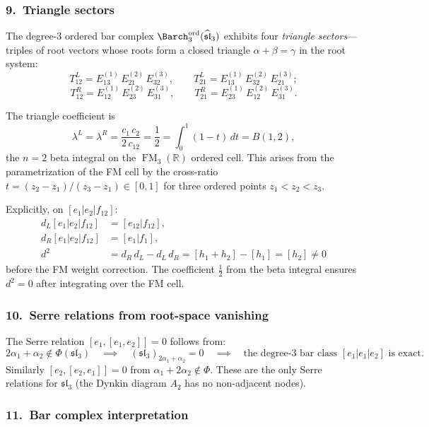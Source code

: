 \subsubsection*{9.\ Triangle sectors}

The degree-$3$ ordered bar complex
$\Barch_3^{\mathrm{ord}}(\widehat{\mathfrak{sl}}_3)$
exhibits four \emph{triangle sectors}---triples of root vectors
whose roots form a closed triangle
$\alpha + \beta = \gamma$ in the root system:
\[
T^L_{12} = E_{13}^{(1)}\,E_{21}^{(2)}\,E_{32}^{(3)},
\qquad
T^L_{21} = E_{13}^{(1)}\,E_{32}^{(2)}\,E_{21}^{(3)};
\]
\[
T^R_{12} = E_{12}^{(1)}\,E_{23}^{(2)}\,E_{31}^{(3)},
\qquad
T^R_{21} = E_{23}^{(1)}\,E_{12}^{(2)}\,E_{31}^{(3)}.
\]

The triangle coefficient is
\begin{equation}\label{eq:triangle-half}
\lambda^L = \lambda^R
= \frac{c_1\,c_2}{2\,c_{12}}
= \frac{1}{2}
= \int_0^1 (1-t)\,dt
= B(1,2),
\end{equation}
the $n=2$ beta integral on the $\operatorname{FM}_3(\mathbb{R})$ ordered cell.
This arises from the parametrization of the FM cell
by the cross-ratio $t = (z_2 - z_1)/(z_3 - z_1) \in [0,1]$
for three ordered points $z_1 < z_2 < z_3$.

Explicitly, on $[e_1 | e_2 | f_{12}]$:
\begin{align*}
d_L[e_1|e_2|f_{12}] &= [e_{12} | f_{12}], \\
d_R[e_1|e_2|f_{12}] &= [e_1 | f_1], \\
d^2 &= d_R\,d_L - d_L\,d_R
= [h_1 + h_2] - [h_1] = [h_2] \neq 0
\end{align*}
before the FM weight correction. The coefficient $\tfrac{1}{2}$
from the beta integral ensures $d^2 = 0$ after integrating over
the FM cell.

\subsubsection*{10.\ Serre relations from root-space vanishing}

The Serre relation $[e_1, [e_1, e_2]] = 0$ follows from:
\[
2\alpha_1 + \alpha_2 \notin \Phi(\mathfrak{sl}_3)
\quad\implies\quad
(\mathfrak{sl}_3)_{2\alpha_1 + \alpha_2} = 0
\quad\implies\quad
\text{the degree-3 bar class } [e_1|e_1|e_2]
\text{ is exact}.
\]
Similarly $[e_2,[e_2,e_1]] = 0$ from
$\alpha_1 + 2\alpha_2 \notin \Phi$.
These are the only Serre relations for $\mathfrak{sl}_3$
(the Dynkin diagram $A_2$ has no non-adjacent nodes).

\subsubsection*{11.\ Bar complex interpretation}

